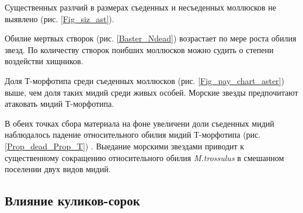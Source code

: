 \documentclass[a0,portrait]{a0poster}
\begin{document}
\begin{multicols}{2}
\begin{minipage}[t]{0.46\linewidth}
\begin{center}
			\label{Prop_dead_Prop_T}
		\end{center}
\end{minipage}\vspace{0.5cm}

\vspace{\belowdisplayskip}


Существенных разлчий в размерах съеденных и несъеденных моллюсков не выявлено (рис. \ref{Fig_siz_ast}). 

Обилие мертвых створок (рис. \ref{Baster_Ndead}) возрастает по мере роста обилия звезд. По количеству створок поибших моллюсков можно судить о степени воздействи хищников.  

Доля Т-морфотипа среди съеденных моллюсков (рис.  \ref{Fig_pay_chart_aster}) выше, чем доля таких мидий среди живых особей. Морские звезды предпочитают атаковать мидий Т-морфотипа. 

В обеих точках сбора материала на фоне увеличени доли съеденных мидий наблюдалось падение относительного обилия мидий Т-морфотипа (рис. \ref{Prop_dead_Prop_T}) . Выедание морскими звездами приводит к существенному сокращению относительного обилия \emph{M.trossulus} в смешанном поселении двух видов мидий.




\subsection*{Влияние куликов-сорок}




\end{multicols}
\end{document}
